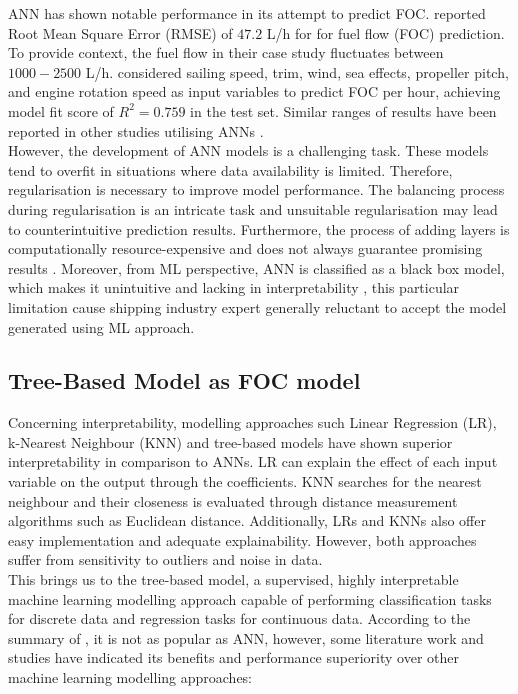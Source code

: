 ANN has shown notable performance in its attempt to predict FOC.  reported Root Mean Square Error (RMSE) of $47.2$ L/h for for fuel flow (FOC) prediction. To provide context, the fuel flow in their case study fluctuates between $1000 - 2500$ L/h.  considered sailing speed, trim, wind, sea effects, propeller pitch, and engine rotation speed as input variables to predict FOC per hour, achieving model fit score of $R^2 = 0.759$ in the test set. Similar ranges of results have been reported in other studies utilising ANNs .\\

However, the development of ANN models is a challenging task. These models tend to overfit in situations where data availability is limited. Therefore, regularisation is necessary to improve model performance. The balancing process during regularisation is an intricate task and unsuitable regularisation may lead to counterintuitive prediction results. Furthermore, the process of adding layers is computationally resource-expensive and does not always guarantee promising results . Moreover, from ML perspective, ANN is classified as a black box model, which makes it unintuitive and lacking in interpretability  , this particular limitation cause shipping industry expert generally reluctant to accept the model generated using ML approach. \\

\subsection{Tree-Based Model as FOC model}\label{sec:tree_litreview}

Concerning interpretability, modelling approaches such Linear Regression (LR), k-Nearest Neighbour (KNN) and tree-based models have shown superior interpretability in comparison to ANNs. LR can explain the effect of each input variable on the output through the coefficients. KNN searches for the nearest neighbour and their closeness is evaluated through distance measurement algorithms such as Euclidean distance. Additionally, LRs and KNNs also offer easy implementation and adequate explainability. However, both approaches suffer from sensitivity to outliers and noise in data.\\

This brings us to the tree-based model, a supervised, highly interpretable machine learning modelling approach capable of performing classification tasks for discrete data and regression tasks for continuous data. According to the summary of , it is not as popular as ANN, however, some literature work and studies have indicated its benefits and performance superiority over other machine learning modelling approaches:\\

